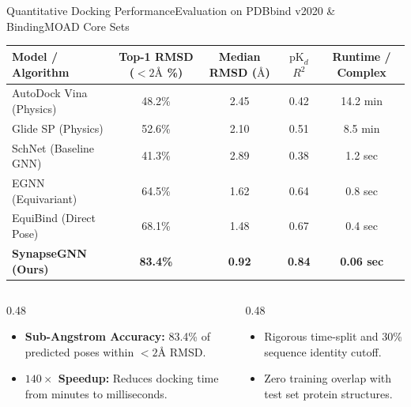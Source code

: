 \documentclass[10pt,aspectratio=169]{beamer}
\begin{document}
\begin{frame}{Quantitative Docking Performance}{Evaluation on PDBbind v2020 \& BindingMOAD Core Sets}
  \centering
  \tiny
  \begin{tabularx}{0.95\textwidth}{X c c c c}
    \toprule
    \textbf{\color{NavyDark} Model / Algorithm} & \textbf{\color{NavyDark} Top-1 RMSD ($<2\text{\AA}$ \%)} & \textbf{\color{NavyDark} Median RMSD ($\text{\AA}$)} & \textbf{\color{NavyDark} $\mathrm{pK}_d$ $R^2$} & \textbf{\color{NavyDark} Runtime / Complex} \\
    \midrule
    AutoDock Vina (Physics) & 48.2\% & 2.45 & 0.42 & 14.2 min \\
    Glide SP (Physics)     & 52.6\% & 2.10 & 0.51 & 8.5 min \\
    SchNet (Baseline GNN)  & 41.3\% & 2.89 & 0.38 & 1.2 sec \\
    EGNN (Equivariant)     & 64.5\% & 1.62 & 0.64 & 0.8 sec \\
    EquiBind (Direct Pose) & 68.1\% & 1.48 & 0.67 & 0.4 sec \\
    \midrule
    \rowcolor{TealPrimary!15}
    \textbf{SynapseGNN (Ours)} & \textbf{83.4\%} & \textbf{0.92} & \textbf{0.84} & \textbf{0.06 sec} \\
    \bottomrule
  \end{tabularx}

  \vspace{6pt}
  \begin{columns}[T]
    \begin{column}{0.48\textwidth}
      \begin{tcolorbox}[highlightbox,title={\faChartLine \quad Key Performance Highlights}]
        \tiny
        \begin{itemize}
          \item \textbf{Sub-Angstrom Accuracy:} 83.4\% of predicted poses within $<2\text{\AA}$ RMSD.
          \item \textbf{$140\times$ Speedup:} Reduces docking time from minutes to milliseconds.
        \end{itemize}
      \end{tcolorbox}
    \end{column}
    
    \begin{column}{0.48\textwidth}
      \begin{tcolorbox}[defensebox,title={\faDatabase \quad Dataset Splitting}]
        \tiny
        \begin{itemize}
          \item Rigorous time-split and 30\% sequence identity cutoff.
          \item Zero training overlap with test set protein structures.
        \end{itemize}
      \end{tcolorbox}
    \end{column}
  \end{columns}
\end{frame}
\end{document}
